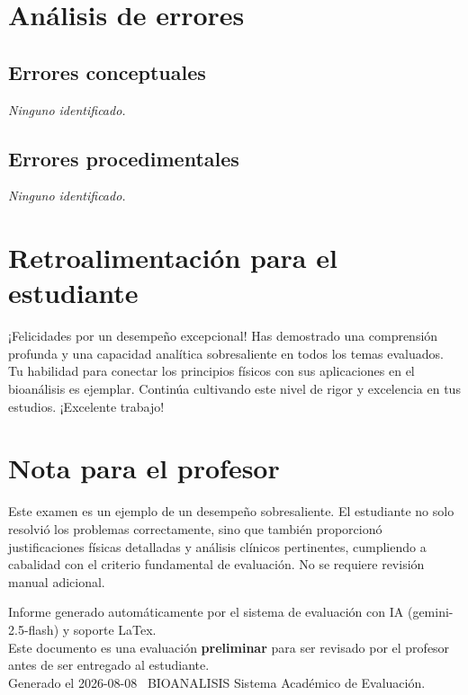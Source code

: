 \documentclass[11pt,a4paper]{article}
\begin{document}
\section*{Análisis de errores}

\subsection*{Errores conceptuales}
\textit{Ninguno identificado.}

\subsection*{Errores procedimentales}
\textit{Ninguno identificado.}

\section*{Retroalimentación para el estudiante}
\begin{tcolorbox}[cajaRecomendacion, title={Dirigido a: Daniela Rivero}]
¡Felicidades por un desempeño excepcional! Has demostrado una comprensión profunda y una capacidad analítica sobresaliente en todos los temas evaluados. Tu habilidad para conectar los principios físicos con sus aplicaciones en el bioanálisis es ejemplar. Continúa cultivando este nivel de rigor y excelencia en tus estudios. ¡Excelente trabajo!
\end{tcolorbox}

\section*{Nota para el profesor}
\begin{tcolorbox}[
  enhanced, breakable,
  colback=yellow!8, colframe=yellow!60!black,
  fonttitle=\bfseries, coltitle=black,
  title={Observaciones para revisión manual},
  top=4pt, bottom=4pt, left=8pt, right=8pt,
]
Este examen es un ejemplo de un desempeño sobresaliente. El estudiante no solo resolvió los problemas correctamente, sino que también proporcionó justificaciones físicas detalladas y análisis clínicos pertinentes, cumpliendo a cabalidad con el criterio fundamental de evaluación. No se requiere revisión manual adicional.
\end{tcolorbox}

\vspace{12pt}
\begin{center}
  \footnotesize\color{gray}
  Informe generado automáticamente por el sistema de evaluación con IA (gemini-2.5-flash) y soporte LaTex. \\
  Este documento es una evaluación \textbf{preliminar} para ser revisado por el profesor antes de ser entregado al 
  estudiante. \\
  Generado el 2026-08-08 \textbullet\ BIOANALISIS Sistema Académico de Evaluación.
  \end{center}
\end{document}
